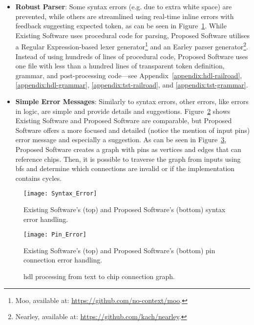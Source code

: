 \begin{itemize}
    \item \textbf{Robust Parser}: Some syntax errors (e.g. due to extra white space) are prevented, while others are streamlined using real-time inline errors with feedback suggesting expected token, as can be seen in Figure~\ref{fig:design-syntax-errors}. While Existing Software uses procedural code for parsing, Proposed Software utilises a Regular Expression-based lexer generator\footnote{Moo, available at: \url{https://github.com/no-context/moo}.} and an Earley parser generator\footnote{Nearley, available at: \url{https://github.com/kach/nearley}.}. Instead of using hundreds of lines of procedural code, Proposed Software uses one file with less than a hundred lines of transparent token definition, grammar, and post-processing code---see Appendix~\ref{appendix:hdl-railroad}, \ref{appendix:hdl-grammar}, \ref{appendix:tst-railroad}, and \ref{appendix:tst-grammar}.
    \item \textbf{Simple Error Messages}: Similarly to syntax errors, other errors, like errors in logic, are simple and provide details and suggestions. Figure~\ref{fig:design-pin-error} shows Existing Software and Proposed Software are comparable, but Proposed Software offers a more focused and detailed (notice the mention of input pins) error message and especially a suggestion. As can be seen in Figure~\ref{fig:design-text-ast-graph}, Proposed Software creates a graph with pins as vertices and edges that can reference chips. Then, it is possible to traverse the graph from inputs using \gls{bfs} and determine which connections are invalid or if the implementation contains cycles.
\end{itemize}

\begin{figure}[H]
    \centering
    \texttt{[image: Syntax\_Error]}
    \caption{Existing Software's (top) and Proposed Software's (bottom) syntax error handling.}
    \label{fig:design-syntax-errors}
\end{figure}

\begin{figure}[H]
    \centering
    \texttt{[image: Pin\_Error]}
    \caption{Existing Software's (top) and Proposed Software's (bottom) pin connection error handling.}
    \label{fig:design-pin-error}
\end{figure}

\begin{figure}[H]
    \centering
    
    \caption{\gls{hdl} processing from text to chip connection graph.}
    \label{fig:design-text-ast-graph}
\end{figure}

